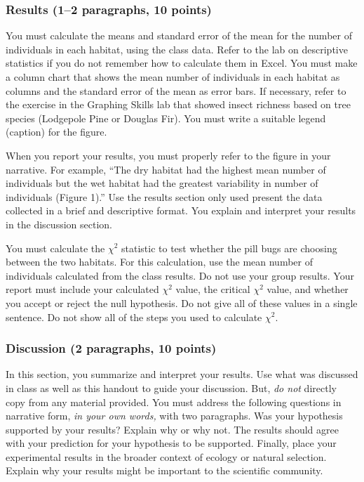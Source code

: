 \documentclass[12pt, hidelinks]{exam}
\newcommand\chisq{$\chi^2$}
\begin{document}
\subsubsection*{Results (1–2 paragraphs, 10 points)}

You must calculate the means and standard error of the mean for the number of individuals in each habitat, using the class data. Refer to the lab on descriptive statistics if you do not remember how to calculate them in Excel. You must make a column chart that shows the mean number of individuals in each habitat as columns and the standard error of the mean as error bars. If necessary, refer to the exercise in the Graphing Skills lab that showed insect richness based on tree species (Lodgepole Pine or Douglas Fir). You must write a suitable legend (caption) for the figure. 

When you report your results, you must properly refer to the figure in your narrative. For example, ``The dry habitat had the highest mean number of individuals but the wet habitat had the greatest variability in number of individuals (Figure 1).'' Use the results section only used  present the data collected in a brief and
descriptive format. You explain and interpret your results in the discussion section.   

You must calculate the \chisq{} statistic to test whether the pill bugs are choosing between the two habitats. For this calculation, use the mean number of individuals calculated from the class results. Do not use your group results. Your report must include your calculated \chisq{} value, the critical \chisq{} value, and whether you accept or reject the null hypothesis. Do not give all of these values in a single sentence. Do not show all of the steps you used to calculate \chisq{}. 


\subsubsection*{Discussion (2 paragraphs, 10 points)} 

In this section, you summarize and interpret your results. Use what
was discussed in class as well as this handout to guide
your discussion. But, \emph{do not} directly copy from any material provided.
You must address the following questions in narrative form, \emph{in your own words,} with two
paragraphs. Was your hypothesis supported by your results? Explain why or why not. 
The results should agree with your prediction for your hypothesis to be supported. 
Finally, place your experimental results in the broader context of ecology or natural
selection. Explain why your results might be important to the
scientific community.
\end{document}
